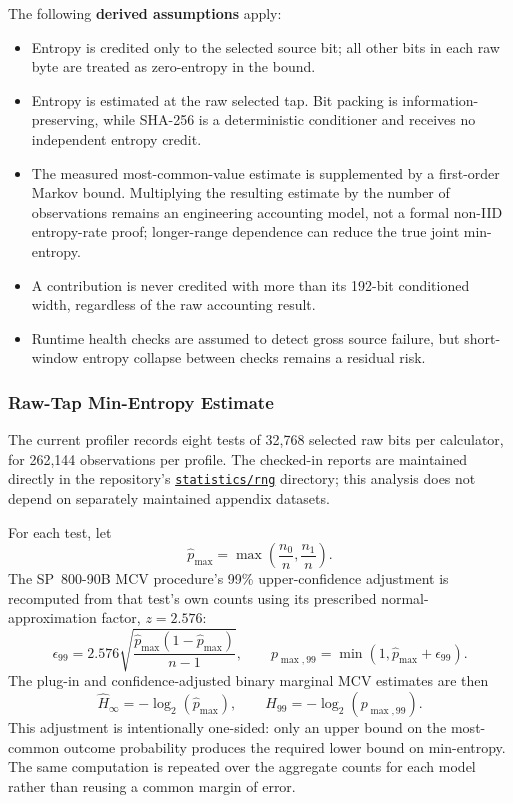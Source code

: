 \documentclass[titlepage]{report}
\begin{document}
		The following \textbf{derived assumptions} apply:
		\begin{itemize}
			\item Entropy is credited only to the selected source bit; all other bits in each raw byte are treated as zero-entropy in the bound.
			\item Entropy is estimated at the raw selected tap. Bit packing is information-preserving, while SHA-256 is a deterministic conditioner and receives no independent entropy credit.
			\item The measured most-common-value estimate is supplemented by a first-order Markov bound. Multiplying the resulting estimate by the number of observations remains an engineering accounting model, not a formal non-IID entropy-rate proof; longer-range dependence can reduce the true joint min-entropy.
			\item A contribution is never credited with more than its 192-bit conditioned width, regardless of the raw accounting result.
			\item Runtime health checks are assumed to detect gross source failure, but short-window entropy collapse between checks remains a residual risk.
		\end{itemize}
		

	\subsubsection{Raw-Tap Min-Entropy Estimate}
	\label{ssec:min_entropy}
	The current profiler records eight tests of 32,768 selected raw bits per calculator, for 262,144 observations per profile. The checked-in reports are maintained directly in the repository's \href{https://github.com/cagscalclabs/lwip-ce/tree/master/statistics/rng}{\texttt{statistics/rng}} directory; this analysis does not depend on separately maintained appendix datasets.

	For each test, let
	\[
		\hat p_{\max}=\max\!\left(\frac{n_0}{n},\frac{n_1}{n}\right).
	\]
	The SP~800-90B MCV procedure's 99\% upper-confidence adjustment is recomputed from that test's own counts using its prescribed normal-approximation factor, $z=2.576$:
	\[
		\epsilon_{99}=2.576\sqrt{\frac{\hat p_{\max}(1-\hat p_{\max})}{n-1}},
		\qquad
		p_{\max,99}=\min(1,\hat p_{\max}+\epsilon_{99}).
	\]
	The plug-in and confidence-adjusted binary marginal MCV estimates are then
	\[
		\widehat H_\infty=-\log_2(\hat p_{\max}),
		\qquad
		H_{99}=-\log_2(p_{\max,99}).
	\]
	This adjustment is intentionally one-sided: only an upper bound on the most-common outcome probability produces the required lower bound on min-entropy. The same computation is repeated over the aggregate counts for each model rather than reusing a common margin of error.
\end{document}
